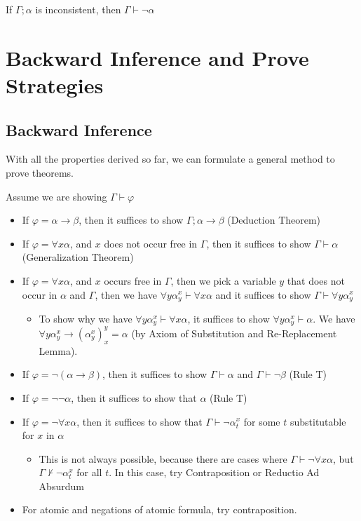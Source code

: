\begin{itemize}
\begin{itemize}
    \end{itemize}
\end{itemize}

\begin{theorem}
    \label{thm:ReductioAdAbsurdum}
    If $\Gamma;\alpha$ is inconsistent, then $\Gamma\vdash\neg\alpha$
\end{theorem}

\section{Backward Inference and Prove Strategies}

\subsection{Backward Inference}

With all the properties derived so far, we can formulate a general method to prove theorems.

Assume we are showing $\Gamma\vdash\varphi$

\begin{itemize}
    \item If $\varphi = \alpha\to\beta$, then it suffices to show $\Gamma;\alpha\to\beta$ (Deduction Theorem)
    \item If $\varphi = \forall x \alpha$, and $x$ does not occur free in $\Gamma$, then it suffices to show $\Gamma\vdash\alpha$ (Generalization Theorem)
    \item If $\varphi = \forall x\alpha$, and $x$ occurs free in $\Gamma$, then we pick a variable $y$ that does not occur in $\alpha$ and $\Gamma$, then we have $\forall y \alpha_y^x\vdash\forall x\alpha$ and it suffices to show $\Gamma\vdash\forall y \alpha_y^x$
    \begin{itemize}
        \item To show why we have $\forall y \alpha_y^x\vdash\forall x\alpha$, it suffices to show $\forall y \alpha_y^x\vdash\alpha$. We have $\forall y \alpha_y^x \to \left( \alpha_y^x \right)_x^y = \alpha$ (by Axiom of Substitution and Re-Replacement Lemma).
    \end{itemize}
    \item If $\varphi = \neg\left( \alpha\to\beta \right)$, then it suffices to show $\Gamma\vdash\alpha$ and $\Gamma\vdash\neg\beta$ (Rule T)
    \item If $\varphi=\neg\neg\alpha$, then it suffices to show that $\alpha$ (Rule T)
    \item If $\varphi=\neg\forall x \alpha$, then it suffices to show that $\Gamma\vdash\neg\alpha_t^x$ for some $t$ substitutable for $x$ in $\alpha$
    \begin{itemize}
        \item This is not always possible, because there are cases where $\Gamma\vdash\neg\forall x\alpha$, but $\Gamma\nvdash\neg\alpha_t^x$ for all $t$. In this case, try Contraposition or Reductio Ad Absurdum
    \end{itemize}
    \item For atomic and negations of atomic formula, try contraposition.
\end{itemize}

